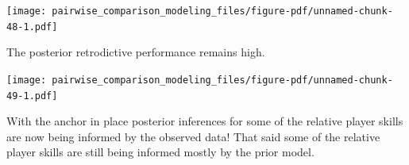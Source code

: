 \documentclass[
  letterpaper,
  DIV=11,
  numbers=noendperiod]{scrartcl}
\newenvironment{Shaded}{\begin{snugshade}}{\end{snugshade}}
\newcommand{\AttributeTok}[1]{\textcolor[rgb]{0.40,0.45,0.13}{#1}}
\newcommand{\ControlFlowTok}[1]{\textcolor[rgb]{0.00,0.23,0.31}{#1}}
\newcommand{\DecValTok}[1]{\textcolor[rgb]{0.68,0.00,0.00}{#1}}
\newcommand{\FunctionTok}[1]{\textcolor[rgb]{0.28,0.35,0.67}{#1}}
\newcommand{\NormalTok}[1]{\textcolor[rgb]{0.00,0.23,0.31}{#1}}
\newcommand{\OtherTok}[1]{\textcolor[rgb]{0.00,0.23,0.31}{#1}}
\newcommand{\SpecialCharTok}[1]{\textcolor[rgb]{0.37,0.37,0.37}{#1}}
\newcommand{\StringTok}[1]{\textcolor[rgb]{0.13,0.47,0.30}{#1}}
\begin{document}
\texttt{[image: pairwise\_comparison\_modeling\_files/figure-pdf/unnamed-chunk-48-1.pdf]}

The posterior retrodictive performance remains high.

\begin{Shaded}
\end{Shaded}

\texttt{[image: pairwise\_comparison\_modeling\_files/figure-pdf/unnamed-chunk-49-1.pdf]}

With the anchor in place posterior inferences for some of the relative
player skills are now being informed by the observed data! That said
some of the relative player skills are still being informed mostly by
the prior model.
\end{document}
